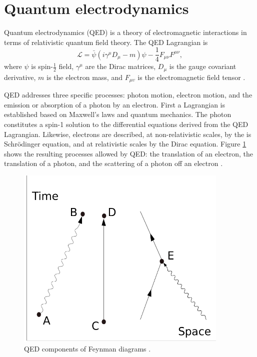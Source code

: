 \section{Quantum electrodynamics}

Quantum electrodynamics (QED) is a theory of electromagnetic interactions in terms of relativistic quantum field theory. The QED Lagrangian is
\begin{equation}
{\mathcal {L}}={\bar {\psi }}(i\gamma ^{\mu }D_{\mu }-m)\psi -{\frac {1}{4}}F_{\mu \nu }F^{\mu \nu },
\end{equation} 
where $\psi$ is spin-$\frac{1}{2}$ field, $\gamma^\mu$ are the Dirac matrices, $D_\mu$ is the gauge covariant derivative, $m$ is the electron mass, and $F_{\mu\upsilon}$ is the electromagnetic field tensor \cite{Peskin:1995ev}.

QED addresses three specific processes: photon motion, electron motion, and the emission or absorption of a photon by an electron. First a Lagrangian is established based on Maxwell's laws and quantum mechanics. The photon constitutes a spin-1 solution to the differential equations derived from the QED Lagrangian. Likewise, electrons are described, at non-relativistic scales, by the is Schr\"{o}dinger equation, and at relativistic scales by the Dirac equation. Figure \ref{fig:qedFeynman} shows the resulting processes allowed by QED: the translation of an electron, the translation of a photon, and the scattering of a photon off an electron \cite{Griffiths:2008zz}. 

\begin{figure}[h!]
\begin{centering}
\includegraphics[width=4in]{Chapter1/importfigs/Feynman_Diagram_Components.png}
\par\end{centering}
\caption{QED components of Feynman diagrams \cite{wikiCommons}. \label{fig:qedFeynman}}
\end{figure}

